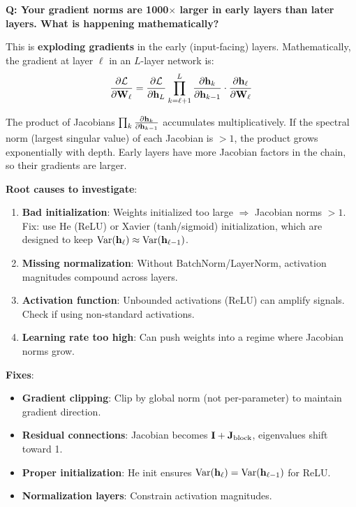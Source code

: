 \begin{interviewq}
\textbf{Q: Your gradient norms are 1000$\times$ larger in early layers than later layers. What is happening mathematically?}

 \quad {} \quad \badgefreq{\freqmed}

\stronganswer
This is \textbf{exploding gradients} in the early (input-facing) layers. Mathematically, the gradient at layer $\ell$ in an $L$-layer network is:
$$\frac{\partial \mathcal{L}}{\partial \mathbf{W}_\ell} = \frac{\partial \mathcal{L}}{\partial \mathbf{h}_L} \prod_{k=\ell+1}^{L} \frac{\partial \mathbf{h}_k}{\partial \mathbf{h}_{k-1}} \cdot \frac{\partial \mathbf{h}_\ell}{\partial \mathbf{W}_\ell}$$

The product of Jacobians $\prod_k \frac{\partial \mathbf{h}_k}{\partial \mathbf{h}_{k-1}}$ accumulates multiplicatively. If the spectral norm (largest singular value) of each Jacobian is $> 1$, the product grows exponentially with depth. Early layers have more Jacobian factors in the chain, so their gradients are larger.

\textbf{Root causes to investigate}:
\begin{enumerate}
    \item \textbf{Bad initialization}: Weights initialized too large $\Rightarrow$ Jacobian norms $> 1$. Fix: use He (ReLU) or Xavier (tanh/sigmoid) initialization, which are designed to keep $\operatorname{Var}(\mathbf{h}_\ell) \approx \operatorname{Var}(\mathbf{h}_{\ell-1})$.
    \item \textbf{Missing normalization}: Without BatchNorm/LayerNorm, activation magnitudes compound across layers.
    \item \textbf{Activation function}: Unbounded activations (ReLU) can amplify signals. Check if using non-standard activations.
    \item \textbf{Learning rate too high}: Can push weights into a regime where Jacobian norms grow.
\end{enumerate}

\textbf{Fixes}:
\begin{itemize}
    \item \textbf{Gradient clipping}: Clip by global norm (not per-parameter) to maintain gradient direction.
    \item \textbf{Residual connections}: Jacobian becomes $\mathbf{I} + \mathbf{J}_{\text{block}}$, eigenvalues shift toward 1.
    \item \textbf{Proper initialization}: He init ensures $\operatorname{Var}(\mathbf{h}_\ell) = \operatorname{Var}(\mathbf{h}_{\ell-1})$ for ReLU.
    \item \textbf{Normalization layers}: Constrain activation magnitudes.
\end{itemize}


\end{interviewq}

